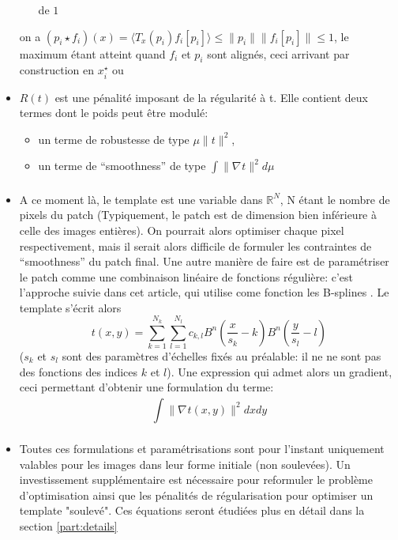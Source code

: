 \documentclass{article}
\begin{document}
\begin{itemize}
\begin{itemize}
                de $ 1 $
        \end{itemize}
        on a $ (p_i \star f_i)(x) = \mathcal  \langle T_x(p_i) f_i[p_i] \rangle  \leq
        \|p_i\| \|f_i[p_i]\| \leq  1$, le maximum étant atteint quand $ f_i $ et $ p_i $ 
        sont alignés, ceci arrivant par construction en $ {x}^{\star}_i $
        ou 
    \item $ R(t) $ est une pénalité imposant de la régularité à t. Elle contient deux
      termes dont le poids peut être modulé:
      \begin{itemize}
        \item un terme de robustesse de type $ \mu\|t\|^2 $,
        \item un terme de ``smoothness'' de type $ \int\limits_{  }^{  } \| \nabla_{
          } t \|^2 d \mu $
      \end{itemize}
    \item A ce moment là, le template est une variable dans $ \mathbb{R}^N$, N étant le
      nombre de pixels du patch (Typiquement, le patch est de dimension bien
        inférieure à celle des images entières). On pourrait alors optimiser chaque pixel
        respectivement, mais il serait alors difficile de formuler les contraintes de
        ``smoothness'' du patch final. Une autre manière de faire est de paramétriser le
        patch comme une combinaison linéaire de fonctions régulière: c'est l'approche
        suivie dans cet article, qui utilise come fonction les B-splines \cite{bspline}. Le template
        s'écrit alors
        \[
            t(x, y) = \sum\limits_{ k=1 }^{ N_k } \sum\limits_{ l=1 }^{ N_l } c_{k, l} B^n \left (
            \frac{x}{s_k} - k \right ) B^n \left ( \frac{y}{s_{l}} - l \right )
            \label{eq:spline} \tag{1}
        \] 
        ($ s_k $ et $ s_l $ sont des paramètres d'échelles fixés au préalable: il ne
        ne sont pas des fonctions des indices $ k $ et $ l $).
        Une expression qui admet alors un gradient, ceci permettant d'obtenir une
        formulation du terme: 
        \[
            \int\limits_{  }^{  } \| \nabla_{  } t(x, y) \|^2 dx dy
        \] 
    \item Toutes ces formulations et paramétrisations sont pour l'instant uniquement
      valables pour les images dans leur forme initiale (non soulevées). Un
      investissement supplémentaire est nécessaire pour reformuler le problème
      d'optimisation ainsi que les pénalités de régularisation pour optimiser un
      template "soulevé". Ces équations seront étudiées plus en détail dans la section
      \ref{part:details}
\end{itemize}
\end{document}
